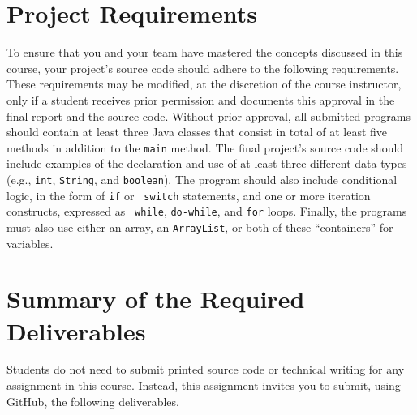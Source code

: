 \documentclass[11pt]{article}
\begin{document}
\section*{Project Requirements}

To ensure that you and your team have mastered the concepts discussed in this
course, your project's source code should adhere to the following requirements.
These requirements may be modified, at the discretion of the course instructor,
only if a student receives prior permission and documents this approval in the
final report and the source code. Without prior approval, all submitted programs
should contain at least three Java classes that consist in total of at least
five methods in addition to the {\tt main} method. The final project's source
code should include examples of the declaration and use of at least three
different data types (e.g., {\tt int}, {\tt String}, and {\tt boolean}). The
program should also include conditional logic, in the form of {\tt if} or {\tt
switch} statements, and one or more iteration constructs, expressed as {\tt
while}, {\tt do-while}, and {\tt for} loops. Finally, the programs must also use
either an array, an {\tt ArrayList}, or both of these ``containers'' for
variables.

\section*{Summary of the Required Deliverables}

\noindent Students do not need to submit printed source code or technical writing for any assignment in this course.
Instead, this assignment invites you to submit, using GitHub, the following deliverables.
\end{document}
